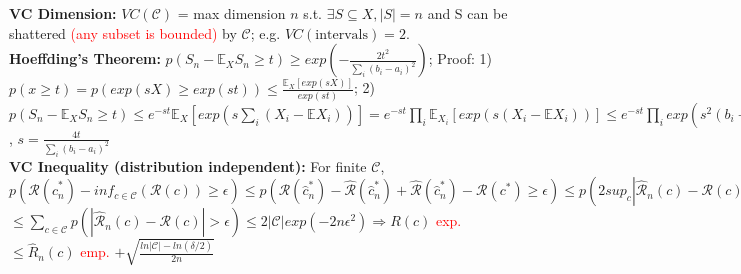 \textbf{VC Dimension: } $VC(\mathcal{C})$ = max dimension $n$ s.t. $\exists S \subseteq X, |S| = n$ and S can be shattered \textcolor{red}{(any subset is bounded)} by $\mathcal{C}$; e.g. $VC(\text{intervals}) = 2$. \\
\textbf{Hoeffding's Theorem: } 
$p(S_n - \mathbb{E}_XS_n \geq t) \geq exp(-\frac{2t^2}{\sum_i (b_i - a_i)^2})$; Proof: 1) $p(x \geq t) = p(exp(sX) \geq exp(st)) \leq \frac{\mathbb{E}_X [exp(sX)]}{exp(st)}$; 2) $p(S_n - \mathbb{E}_XS_n \geq t) \leq e^{-st}\mathbb{E}_X[exp(s\sum_i (X_i - \mathbb{E}X_i))] = e^{-st}\prod_i\mathbb{E}_{X_i}[exp(s(X_i-\mathbb{E}X_i))] \leq e^{-st}\prod_iexp(s^2(b_i-a_i)^2/8)$, $s = \frac{4t}{\sum_i(b_i-a_i)^2}$
\\
\textbf{VC Inequality (distribution independent): } For finite $\mathcal{C}$, $p(\mathcal{R}(\hat{c}_n^*) - inf_{c \in \mathcal{C}}(\mathcal{R}(c)) \geq \epsilon) \leq p(\mathcal{R}(\hat{c}_n^*) - \hat{\mathcal{R}}(\hat{c}_n^*) + \hat{\mathcal{R}}(\hat{c}_n^*) - \mathcal{R}(c^*) \geq \epsilon) \leq p(2sup_{c}|\hat{\mathcal{R}}_n(c) - \mathcal{R}(c)| > \epsilon)$
$\leq \sum_{c \in \mathcal{C}}p(|\hat{\mathcal{R}}_n(c) - \mathcal{R}(c)| > \epsilon) \leq 2|\mathcal{C}|exp(-2n\epsilon^2) \Rightarrow R(c)$ \textcolor{red}{exp.} $ \leq \hat{R}_n(c) $ \textcolor{red}{emp.} $ + \sqrt{\frac{ln |\mathcal{C}| - ln(\delta / 2)}{2n}}$
